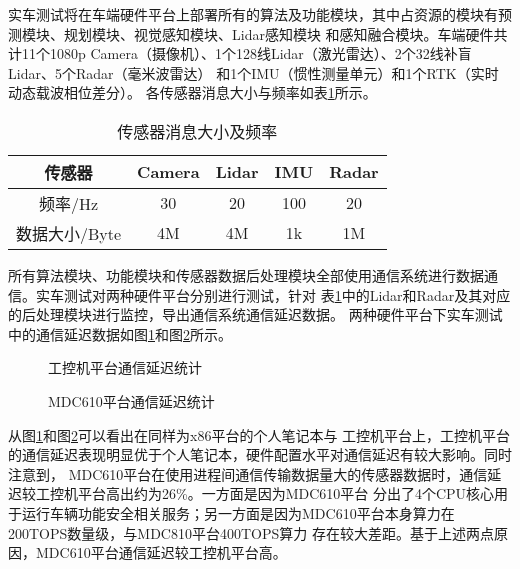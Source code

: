 实车测试将在车端硬件平台上部署所有的算法及功能模块，其中占资源的模块有预测模块、规划模块、视觉感知模块、Lidar感知模块
和感知融合模块。车端硬件共计11个1080p Camera（摄像机）、1个128线Lidar（激光雷达）、2个32线补盲Lidar、5个Radar（毫米波雷达）
和1个IMU（惯性测量单元）和1个RTK（实时动态载波相位差分）。
各传感器消息大小与频率如表\ref{sensor_frequency_size}所示。
\begin{table}[H]
  \centering\small
  \caption{传感器消息大小及频率}
  \label{sensor_frequency_size}
  \begin{tabular}{ccccc}
    \toprule
    传感器 & Camera & Lidar & IMU & Radar \\
    \midrule
    频率/Hz & 30 & 20 & 100 & 20 \\
    数据大小/Byte & 4M & 4M & 1k & 1M\\
    \bottomrule
  \end{tabular}
\end{table}
所有算法模块、功能模块和传感器数据后处理模块全部使用通信系统进行数据通信。实车测试对两种硬件平台分别进行测试，针对
表\ref{sensor_frequency_size}中的Lidar和Radar及其对应的后处理模块进行监控，导出通信系统通信延迟数据。
两种硬件平台下实车测试中的通信延迟数据如图\ref{x86_latency_statistic}和图\ref{mdc_latency_statistic}所示。

\begin{figure}[H]
  \centering
  \caption{工控机平台通信延迟统计}
  \label{x86_latency_statistic}
\end{figure}

\begin{figure}[H]
  \centering
  \caption{MDC610平台通信延迟统计}
  \label{mdc_latency_statistic}
\end{figure}

从图\ref{x86_latency_statistic}和图\ref{mdc_latency_statistic}可以看出在同样为x86平台的个人笔记本与
工控机平台上，工控机平台的通信延迟表现明显优于个人笔记本，硬件配置水平对通信延迟有较大影响。同时注意到，
MDC610平台在使用进程间通信传输数据量大的传感器数据时，通信延迟较工控机平台高出约为26\%。一方面是因为MDC610平台
分出了4个CPU核心用于运行车辆功能安全相关服务；另一方面是因为MDC610平台本身算力在200TOPS数量级，与MDC810平台400TOPS算力
存在较大差距。基于上述两点原因，MDC610平台通信延迟较工控机平台高。

